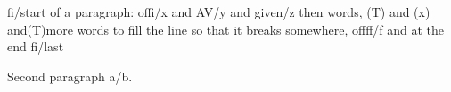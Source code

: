 \documentclass{article}
\newcommand{\opt}[2][fi]{#1/#2}
\newcommand*{\tag}[1][T]{(#1)}
\begin{document}
\opt{start} of a paragraph: of\opt{x} and A\opt[V]{y} and \opt [given] {z} then
words, \tag{} and \tag[x] and\tag more words to fill the line so that it breaks
somewhere, off\opt[ff]{f} and at the end \opt{last}

Second paragraph \opt[a]{b}.
\end{document}
